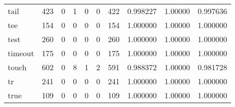 \begin{longtable}{lrrrrrrrrr}
tail      &                    423 &                                  0 &                                 1 &                                0 &                                 0 &                             422 &                                0.998227 &                                1.00000 &                             0.997636 \\
tee       &                    154 &                                  0 &                                 0 &                                0 &                                 0 &                             154 &                                1.000000 &                                1.00000 &                             1.000000 \\
test      &                    260 &                                  0 &                                 0 &                                0 &                                 0 &                             260 &                                1.000000 &                                1.00000 &                             1.000000 \\
timeout   &                    175 &                                  0 &                                 0 &                                0 &                                 0 &                             175 &                                1.000000 &                                1.00000 &                             1.000000 \\
touch     &                    602 &                                  0 &                                 8 &                                1 &                                 2 &                             591 &                                0.988372 &                                1.00000 &                             0.981728 \\
tr        &                    241 &                                  0 &                                 0 &                                0 &                                 0 &                             241 &                                1.000000 &                                1.00000 &                             1.000000 \\
true      &                    109 &                                  0 &                                 0 &                                0 &                                 0 &                             109 &                                1.000000 &                                1.00000 &                             1.000000 \\

\end{longtable}
